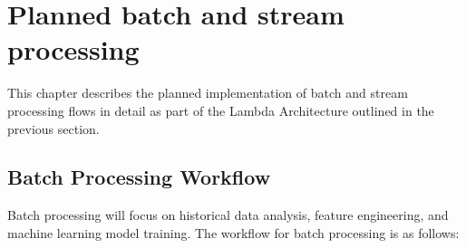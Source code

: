 \documentclass[12pt,a4paper, hidelinks]{article}
\begin{document}

\section{Planned batch and stream processing}

This chapter describes the planned implementation of batch and stream processing flows in detail as part of the Lambda Architecture outlined in the previous section.

\subsection{Batch Processing Workflow}
Batch processing will focus on historical data analysis, feature engineering, and machine learning model training. The workflow for batch processing is as follows:
\end{document}
